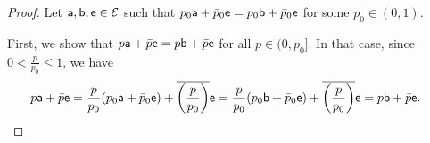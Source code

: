 \begin{proof}
	Let $\ens[a], \ens[b], \ens \in \Ens$ such that $p_0\ens[a] + \bar{p}_0 \ens = p_0 \ens[b] + \bar{p}_0 \ens$ for some $p_0 \in (0,1)$.
	
	First, we show that $p\ens[a] + \bar{p} \ens = p \ens[b] + \bar{p} \ens$ for all $p \in (0,p_0]$. In that case, since $0 < \frac{p}{p_0} \leq 1$, we have
	\begin{equation}
		\begin{aligned}
			p \ens[a] + \bar{p} \ens &= \frac{p}{p_0} (p_0 \ens[a] + \bar{p}_0 \ens) + \overline{\left(\frac{p}{p_0}\right)} \ens = \frac{p}{p_0} (p_0 \ens[b] + \bar{p}_0 \ens) + \overline{\left(\frac{p}{p_0}\right)} \ens = p \ens[b] + \bar{p} \ens.
		\end{aligned}
	\end{equation}
	

\end{proof}
